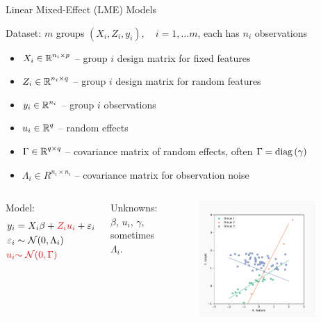 \documentclass[8pt]{beamer}
\begin{document}
\begin{frame}{Linear Mixed-Effect (LME) Models}

	Dataset: $m$ groups $(X_i, Z_i, y_i),\quad i = 1, \dots m$, each has $n_i$ observations
	\begin{itemize}
		\item 	$X_i \in \operatorname{\mathbb{R}}^{n_i \times p}$ -- group $i$ design matrix for fixed features
		\item 	$Z_i \in \operatorname{\mathbb{R}}^{n_i \times q}$ -- group $i$ design matrix for random features
		\item 	$y_i \in \operatorname{\mathbb{R}}^{n_i}$ -- group $i$ observations  
		\item   $u_i \in \operatorname{\mathbb{R}}^q$ -- random effects
		\item   $\Gamma \in \operatorname{\mathbb{R}}^{q \times q}$ -- covariance matrix of random effects, often $\Gamma = \mathrm{diag}\left(\gamma\right)$
		\item   $\Lambda_i \in R^{n_i \times n_i}$ -- covariance matrix for observation noise
	\end{itemize}
	

	\begin{columns}[T,onlytextwidth]
	
    \vspace{3em}
    Model:
	 	\[
   		\begin{split}
   			y_i & = X_i\beta + {\color{red}Z_i u_i} + \varepsilon_i \\
   			 \varepsilon_i & \sim \operatorname{\mathcal{N}}(0, \Lambda_i) \\
   			{\color{red} u_i} & {\color{red}\sim \operatorname{\mathcal{N}}(0, \Gamma)}
   		\end{split}
   		\]
   		   	
	Unknowns: $\beta$, $u_i$, $\gamma$, sometimes $\Lambda_i$.
	
    	\centering  
   	\begin{figure}
   		\includegraphics[width=0.9\textwidth]{Figures/lme_example_random_prediction}
   	\end{figure}
   	   		


\end{columns}
\end{frame}
\end{document}
